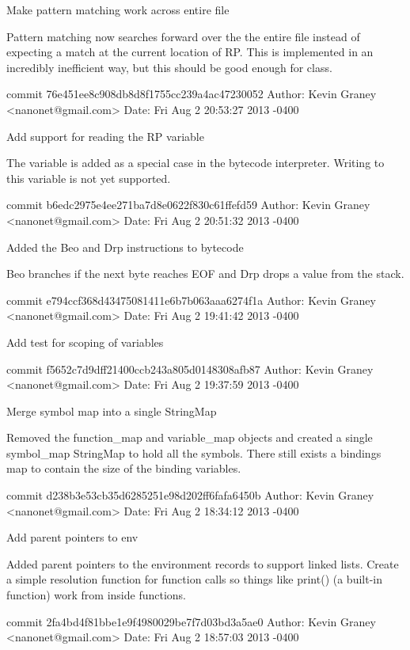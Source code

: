     Make pattern matching work across entire file
    
    Pattern matching now searches forward over the the entire file
    instead of expecting a match at the current location of RP.  This
    is implemented in an incredibly inefficient way, but this should
    be good enough for class.

commit 76e451ee8c908db8d8f1755cc239a4ac47230052
Author: Kevin Graney <nanonet@gmail.com>
Date:   Fri Aug 2 20:53:27 2013 -0400

    Add support for reading the RP variable
    
    The variable is added as a special case in the bytecode interpreter.
    Writing to this variable is not yet supported.

commit b6edc2975e4ee271ba7d8e0622f830c61ffefd59
Author: Kevin Graney <nanonet@gmail.com>
Date:   Fri Aug 2 20:51:32 2013 -0400

    Added the Beo and Drp instructions to bytecode
    
    Beo branches if the next byte reaches EOF and Drp drops a value
    from the stack.

commit e794ccf368d43475081411e6b7b063aaa6274f1a
Author: Kevin Graney <nanonet@gmail.com>
Date:   Fri Aug 2 19:41:42 2013 -0400

    Add test for scoping of variables

commit f5652c7d9dff21400ccb243a805d0148308afb87
Author: Kevin Graney <nanonet@gmail.com>
Date:   Fri Aug 2 19:37:59 2013 -0400

    Merge symbol map into a single StringMap
    
    Removed the function_map and variable_map objects and created a
    single symbol_map StringMap to hold all the symbols.  There still
    exists a bindings map to contain the size of the binding variables.

commit d238b3e53cb35d6285251e98d202ff6fafa6450b
Author: Kevin Graney <nanonet@gmail.com>
Date:   Fri Aug 2 18:34:12 2013 -0400

    Add parent pointers to env
    
    Added parent pointers to the environment records to support linked
    lists.  Create a simple resolution function for function calls so
    things like print() (a built-in function) work from inside functions.

commit 2fa4bd4f81bbe1e9f4980029be7f7d03bd3a5ae0
Author: Kevin Graney <nanonet@gmail.com>
Date:   Fri Aug 2 18:57:03 2013 -0400

